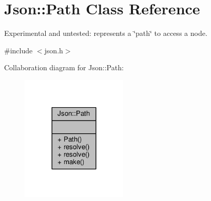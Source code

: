 \hypertarget{classJson_1_1Path}{}\section{Json\+:\+:Path Class Reference}
\label{classJson_1_1Path}


Experimental and untested\+: represents a \char`\"{}path\char`\"{} to access a node.  




{\ttfamily \#include $<$json.\+h$>$}



Collaboration diagram for Json\+:\+:Path\+:
\nopagebreak
\begin{figure}[H]
\begin{center}
\leavevmode
\includegraphics[width=144pt]{df/d69/classJson_1_1Path__coll__graph}
\end{center}
\end{figure}
